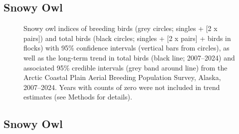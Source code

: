\documentclass[
]{article}
\begin{document}
\newpage{}

\subsection*{Snowy Owl}\label{snowy-owl}

\begin{figure}


\caption{\label{fig-SNOW}Snowy owl indices of breeding birds (grey
circles; singles + {[}2 x pairs{]}) and total birds (black circles;
singles + {[}2 x pairs{]} + birds in flocks) with 95\% confidence
intervals (vertical bars from circles), as well as the long-term trend
in total birds (black line; 2007--2024) and associated 95\% credible
intervals (grey band around line) from the Arctic Coastal Plain Aerial
Breeding Population Survey, Alaska, 2007--2024. Years with counts of
zero were not included in trend estimates (see Methods for details).}

\end{figure}%

\newpage{}

\subsection*{Snowy Owl}\label{snowy-owl-1}

\begingroup\fontsize{10}{12}\selectfont
\end{document}
